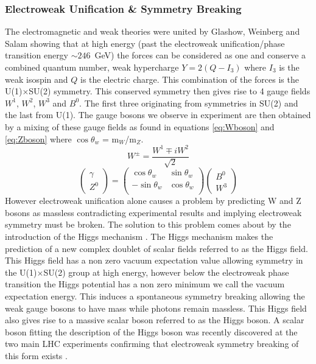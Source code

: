     \subsubsection*{Electroweak Unification \& Symmetry Breaking}
    The electromagnetic and weak theories were united by Glashow, Weinberg and Salam \cite{Glashow1961579,PhysRevLett.19.1264,Salam:1968rm} showing that at high energy (past the electroweak unification/phase transition energy $\sim246$~GeV) the forces can be considered as one and conserve a combined quantum number, weak hypercharge $Y = 2(Q - I_{3}) $ where $I_{3}$ is the weak isospin and $Q$ is the electric charge. This combination of the forces is the U(1)$\times$SU(2) symmetry. This conserved symmetry then gives rise to 4 gauge fields $W^{1}$, $W^{2}$, $W^{3}$ and $B^{0}$. The first three originating from symmetries in SU(2) and the last from U(1). The gauge bosons we observe in experiment are then obtained by a mixing of these gauge fields as found in equations \ref{eq:Wboson} and \ref{eq:Zboson} where $\cos{\theta_{w}}$ = m$_{W}$/m$_{Z}$.
    \begin{equation}
        W^{\pm} = \frac{W^{1} \mp iW^{2}}{\sqrt{2}}
      \label{eq:Wboson}
    \end{equation}
    \begin{equation}
        \left(\begin{array}{c} \gamma \\ Z^{0}\end{array}\right)
          = \left( \begin{array}{cc} 
              \cos\theta_{w} & \sin\theta_{w} \\  
              -\sin\theta_{w} & \cos\theta_{w} \\ 
            \end{array} \right)
            \left(\begin{array}{c} B^{0} \\ W^{3}\end{array}\right)
      \label{eq:Zboson}
    \end{equation}
    However electroweak unification alone causes a problem by predicting W and Z bosons as massless contradicting experimental results and implying electroweak symmetry must be broken. The solution to this problem comes about by the introduction of the Higgs mechanism \cite{PhysRevLett.13.321,PhysRevLett.13.508,PhysRevLett.13.585}. The Higgs mechanism makes the prediction of a new complex doublet of scalar fields referred to as the Higgs field. This Higgs field has a non zero vacuum expectation value allowing symmetry in the U(1)$\times$SU(2) group at high energy, however below the electroweak phase transition the Higgs potential has a non zero minimum we call the vacuum expectation energy. This induces a spontaneous symmetry breaking allowing the weak gauge bosons to have mass while photons remain massless. This Higgs field also gives rise to a massive scalar boson referred to as the Higgs boson. A scalar boson fitting the description of the Higgs boson was recently discovered at the two main LHC experiments confirming that electroweak symmetry breaking of this form exists \cite{Aad20121,Chatrchyan201230}. 


